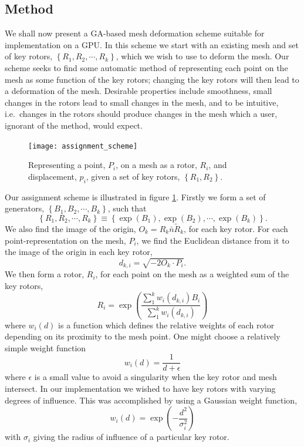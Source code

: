 \subsection{Method}

We shall now present a GA-based mesh deformation scheme suitable for
implementation on a GPU. In this scheme we start with
an existing mesh and set of key rotors, $\left\{ R_1, R_2, \cdots, R_k \right\}$,
which we wish to use to deform the mesh. Our scheme seeks to find some automatic
method of representing each point on the mesh as some function of the key
rotors; changing the key rotors will then lead to a deformation of the mesh. Desirable
properties include smoothness, small changes in the rotors lead to small changes
in the mesh, and to be intuitive, i.e.\ changes in the rotors should produce changes
in the mesh which a user, ignorant of the method, would expect.

\begin{figure}
\centering
\texttt{[image: assignment\_scheme]}
\caption{\label{fig:assignment_scheme}Representing a point, $P_i$, on a mesh as
a rotor, $R_i$, and displacement, $p_i$, given a set of key rotors, 
  $\left\{R_1, R_2\right\}$.}
\end{figure}

Our assignment scheme is illustrated in figure \ref{fig:assignment_scheme}.
Firstly we form a set of generators, $\left\{B_1, B_2, \cdots, B_k\right\}$,
such that
\[
\left\{ R_1, R_2, \cdots, R_k \right\} \equiv \left\{\exp(B_1), \exp(B_2),
        \cdots, \exp(B_k)\right\}.
\]
We also find the image of the origin, $O_k = R_k\bar{n}\tilde{R}_k$, for 
each key rotor. For each point-representation on the mesh, $P_i$, we find the Euclidean
distance from it to the image of the origin in each key rotor,
\[
\label{eqn:dki}
d_{k,i} = \sqrt{-2O_k \cdot P_i}.
\]
We then form a rotor, $R_i$, for each point on the mesh as a weighted sum of the
key rotors,
\[
R_i = \exp\left(\frac{\sum^{k}_1 w_i(d_{k,i}) B_i}{\sum^{k}_1 w_i(d_{k,i})}\right)
\]
where $w_i(d)$ is a function which defines the relative weights of each rotor depending
on its proximity to the mesh point. One might choose a relatively simple weight function
\[
w_i(d) = \frac{1}{d + \epsilon}
\]
where $\epsilon$ is a small value to avoid a singularity when the key rotor and mesh
intersect. In our implementation we wished to have key rotors with varying degrees of 
influence. This was accomplished by using a Gaussian weight function,
\[
w_i(d) = \exp\left(-\frac{d^2}{\sigma_i^2}\right)
\]
with $\sigma_i$ giving the radius of influence of a particular key rotor.

